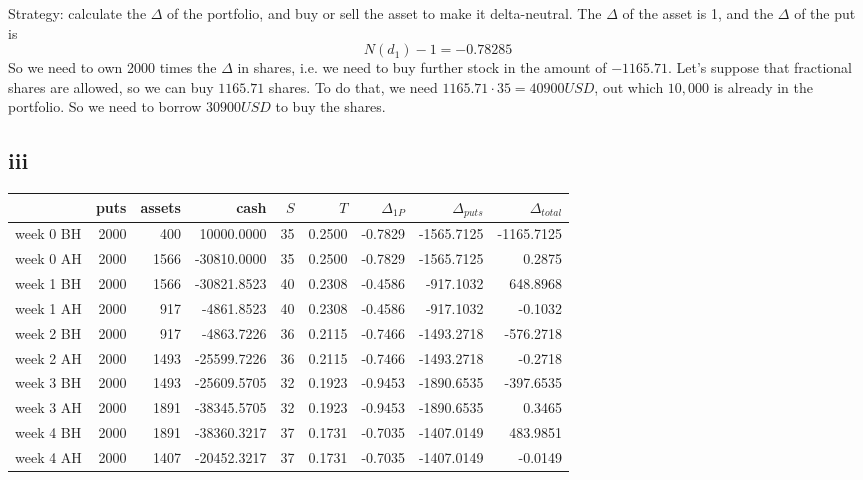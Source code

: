 \documentclass{article}
\begin{document}
Strategy: calculate the $\Delta$ of the portfolio, and buy or sell the asset to make it delta-neutral.
The $\Delta$ of the asset is 1, and the $\Delta$ of the put is $$N(d_1)-1 = -0.78285$$
So we need to own 2000 times the $\Delta$ in shares, i.e. we need to buy further stock in the amount of $-1165.71$.
Let's suppose that fractional shares are allowed, so we can buy $1165.71$ shares.
To do that, we need $1165.71 \cdot 35 = 40900USD$, out which $10,000$ is already in the portfolio.
So we need to borrow $30900USD$ to buy the shares.
\subsection{iii}

\begin{tabular}{lrrrrrrrr}
    \toprule
              & puts & assets & cash        & $S$ & $T$    & $\Delta_{1P}$ & $\Delta_{puts}$ & $\Delta_{total}$ \\
    \midrule
    week 0 BH & 2000 & 400    & 10000.0000  & 35  & 0.2500 & -0.7829       & -1565.7125      & -1165.7125       \\
    week 0 AH & 2000 & 1566   & -30810.0000 & 35  & 0.2500 & -0.7829       & -1565.7125      & 0.2875           \\
    week 1 BH & 2000 & 1566   & -30821.8523 & 40  & 0.2308 & -0.4586       & -917.1032       & 648.8968         \\
    week 1 AH & 2000 & 917    & -4861.8523  & 40  & 0.2308 & -0.4586       & -917.1032       & -0.1032          \\
    week 2 BH & 2000 & 917    & -4863.7226  & 36  & 0.2115 & -0.7466       & -1493.2718      & -576.2718        \\
    week 2 AH & 2000 & 1493   & -25599.7226 & 36  & 0.2115 & -0.7466       & -1493.2718      & -0.2718          \\
    week 3 BH & 2000 & 1493   & -25609.5705 & 32  & 0.1923 & -0.9453       & -1890.6535      & -397.6535        \\
    week 3 AH & 2000 & 1891   & -38345.5705 & 32  & 0.1923 & -0.9453       & -1890.6535      & 0.3465           \\
    week 4 BH & 2000 & 1891   & -38360.3217 & 37  & 0.1731 & -0.7035       & -1407.0149      & 483.9851         \\
    week 4 AH & 2000 & 1407   & -20452.3217 & 37  & 0.1731 & -0.7035       & -1407.0149      & -0.0149          \\
    \bottomrule
\end{tabular}
\end{document}
